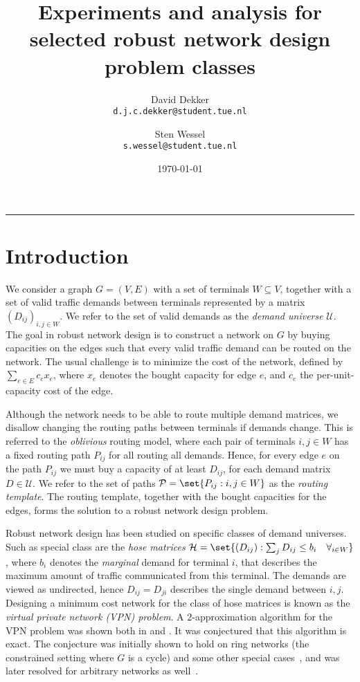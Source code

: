 \documentclass[11pt]{article}
\title{Experiments and analysis for selected robust network design problem classes}
\author{David Dekker \\ \texttt{d.j.c.dekker@student.tue.nl} \and Sten Wessel \\ \texttt{s.wessel@student.tue.nl}}
\date{\today}
\theoremstyle{definition}
\begin{document}
    \maketitle
    \hrule
    \bigskip

    \section{Introduction} \label{sec:introduction}
    We consider a graph $G = (V, E)$ with a set of terminals $W \subseteq V$, together with a set of valid traffic demands between terminals represented by a matrix $(D_{ij})_{i,j \in W}$.
    We refer to the set of valid demands as the \emph{demand universe} $\mathcal U$.
    The goal in robust network design is to construct a network on $G$ by buying capacities on the edges such that every valid traffic demand can be routed on the network.
    The usual challenge is to minimize the cost of the network, defined by $\sum_{e \in E} c_e x_e$, where $x_e$ denotes the bought capacity for edge $e$, and $c_e$ the per-unit-capacity cost of the edge.

    Although the network needs to be able to route multiple demand matrices, we disallow changing the routing paths between terminals if demands change.
    This is referred to the \emph{oblivious} routing model, where each pair of terminals $i,j \in W$ has a fixed routing path $P_{ij}$ for all routing all demands.
    Hence, for every edge $e$ on the path $P_{ij}$ we must buy a capacity of at least $D_{ij}$, for each demand matrix $D \in \mathcal U$.
    We refer to the set of paths $\mathcal P = \set{P_{ij} : i,j \in W}$ as the \emph{routing template}.
    The routing template, together with the bought capacities for the edges, forms the solution to a robust network design problem.

    Robust network design has been studied on specific classes of demand universes.
    Such as special class are the \emph{hose matrices} $\mathcal H = \set{(D_{ij}) : \sum_j D_{ij} \le b_i \quad \forall_{i \in W}}$, where $b_i$ denotes the \emph{marginal} demand for terminal $i$, that describes the maximum amount of traffic communicated from this terminal.
    The demands are viewed as undirected, hence $D_{ij} = D_{ji}$ describes the single demand between $i,j$.
    Designing a minimum cost network for the class of hose matrices is known as the \emph{virtual private network (VPN) problem}.
    A $2$-approximation algorithm for the VPN problem was shown both in \cite{fingerhut1997designing} and \cite{gupta2001provisioning}.
    It was conjectured \cite{italiano2006design} that this algorithm is exact.
    The conjecture was initially shown to hold on ring networks (the constrained setting where $G$ is a cycle) and some other special cases~\cite{hurkens2007virtual}, and was later resolved for arbitrary networks as well~\cite{goyal2013vpn}.
\end{document}
